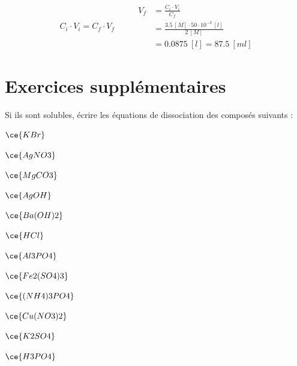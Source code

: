 \documentclass[
  11pt,
  a4paper,
  openany]{book}
\begin{document}
\begin{Answer}
\[
\begin{split}
  C_i \cdot V_i = C_f \cdot V_f
\end{split}
\qquad
\begin{split}
  V_f &= \frac{C_i \cdot V_i}{C_f} \\
  &= \frac{3.5\ [M] \cdot 50 \cdot 10^{-3}\ [l] }{2\ [M]} \\
  &= 0.0875\ [l] = 87.5\ [ml]
\end{split}
\]

\end{Answer}

\hypertarget{exercices-suppluxe9mentaires-7}{%
\section{Exercices supplémentaires}\label{exercices-suppluxe9mentaires-7}}

\begin{Exercise}

Si ils sont solubles, écrire les équations de dissociation des composés suivants :

\begin{multicols}{2}
\(\ce{KBr}\)

\(\ce{AgNO3}\)

\(\ce{MgCO3}\)

\(\ce{AgOH}\)

\(\ce{Ba(OH)2}\)

\(\ce{HCl}\)

\(\ce{Al3PO4}\)

\(\ce{Fe2(SO4)3}\)

\(\ce{(NH4)3PO4}\)

\(\ce{Cu(NO3)2}\)

\(\ce{K2SO4}\)

\(\ce{H3PO4}\)

\end{multicols}

\end{Exercise}
\end{document}
